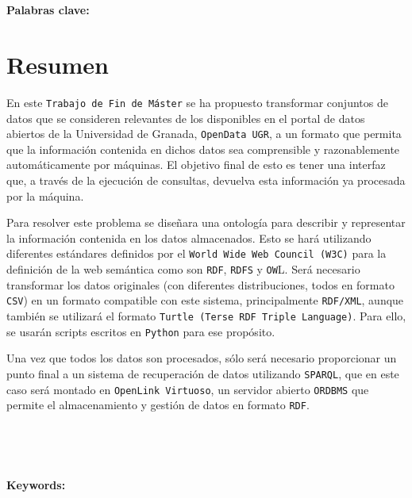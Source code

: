 \begin{center}
{\LARGE\bfseries\titulo}\\
\end{center}
\begin{center}
\autor\
\end{center}

\textbf{Palabras clave: }{\keywordsEs}

\section*{Resumen}

En este {\tt Trabajo de Fin de Máster} se ha propuesto transformar conjuntos de datos que se consideren relevantes de los disponibles en el portal de datos abiertos de la {Universidad de Granada}, {\tt OpenData UGR}, a un formato que permita que la información contenida en dichos datos sea comprensible y razonablemente automáticamente por máquinas. El objetivo final de esto es tener una interfaz que, a través de la ejecución de consultas, devuelva esta información ya procesada por la máquina.

\bigskip
Para resolver este problema se diseñara una ontología para describir y representar la información contenida en los datos almacenados. Esto se hará utilizando diferentes estándares definidos por el {\tt World Wide Web Council (W3C)} para la definición de la web semántica como son {\tt RDF}, {\tt RDFS} y {\tt OW}L. Será necesario transformar los datos originales (con diferentes distribuciones, todos en formato {\tt CSV}) en un formato compatible con este sistema, principalmente {\tt RDF/XML}, aunque también se utilizará el formato {\tt Turtle (Terse RDF Triple Language)}. Para ello, se usarán scripts escritos en {\tt Python} para ese propósito.

\bigskip
Una vez que todos los datos son procesados, sólo será necesario proporcionar un punto final a un sistema de recuperación de datos utilizando {\tt SPARQL}, que en este caso será montado en {\tt OpenLink Virtuoso}, un servidor abierto {\tt ORDBMS} que permite el almacenamiento y gestión de datos en formato {\tt RDF}.

\newpage
\begin{center}
{\LARGE\bfseries\tituloEng}\\
\end{center}
\begin{center}
\autor\
\end{center}

\textbf{Keywords: }{\keywordsEn}

